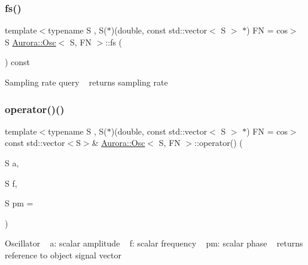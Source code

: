 \subsubsection{\texorpdfstring{fs()}{fs()}}
{\footnotesize\ttfamily template$<$typename S , S($\ast$)(double, const std\+::vector$<$ S $>$ $\ast$) FN = cos$>$ \\
S \hyperlink{class_aurora_1_1_osc}{Aurora\+::\+Osc}$<$ S, FN $>$\+::fs (\begin{DoxyParamCaption}{ }\end{DoxyParamCaption}) const\hspace{0.3cm}{\ttfamily [inline]}}

Sampling rate query ~\newline
returns sampling rate \mbox{\label{class_aurora_1_1_osc_ad12b79aacefcfb108419b03bbeb54d8c}} 
\subsubsection{\texorpdfstring{operator()()}{operator()()}\hspace{0.1cm}{\footnotesize\ttfamily [1/6]}}
{\footnotesize\ttfamily template$<$typename S , S($\ast$)(double, const std\+::vector$<$ S $>$ $\ast$) FN = cos$>$ \\
const std\+::vector$<$S$>$\& \hyperlink{class_aurora_1_1_osc}{Aurora\+::\+Osc}$<$ S, FN $>$\+::operator() (\begin{DoxyParamCaption}\item[{S}]{a,  }\item[{S}]{f,  }\item[{S}]{pm = {} }\end{DoxyParamCaption})\hspace{0.3cm}{\ttfamily [inline]}}

Oscillator ~\newline
a\+: scalar amplitude ~\newline
f\+: scalar frequency ~\newline
pm\+: scalar phase ~\newline
returns reference to object signal vector \mbox{\label{class_aurora_1_1_osc_a706ce9f09193a510060a7bc6e0c44142}} 
